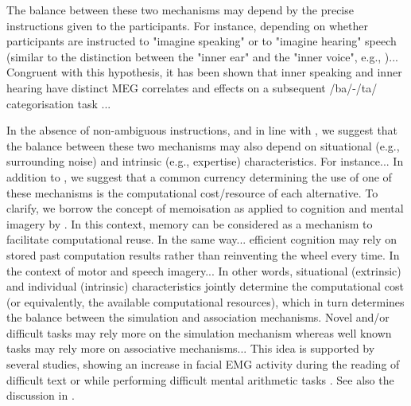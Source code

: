 \documentclass[utf8]{template/frontiersSCNS} %
\begin{document}
The balance between these two mechanisms may depend by the precise instructions given to the participants. For instance, depending on whether participants are instructed to "imagine speaking" or to "imagine hearing" speech (similar to the distinction between the "inner ear" and the "inner voice", e.g., \cite{smith_subvocalization_1992})... Congruent with this hypothesis, it has been shown that inner speaking and inner hearing have distinct MEG correlates and effects on a subsequent /ba/-/ta/ categorisation task \citep{ma_distinct_2019}...

In the absence of non-ambiguous instructions, and in line with \cite{tian_mental_2012}, we suggest that the balance between these two mechanisms may also depend on situational (e.g., surrounding noise) and intrinsic (e.g., expertise) characteristics. For instance... In addition to \cite{tian_mental_2012}, we suggest that a common currency determining the use of one of these mechanisms is the computational cost/resource of each alternative. To clarify, we borrow the concept of memoisation as applied to cognition and mental imagery by \cite{dasgupta_memory_2021}. In this context, memory can be considered as a mechanism to facilitate computational reuse. In the same way... efficient cognition may rely on stored past computation results rather than reinventing the wheel every time. In the context of motor and speech imagery... In other words, situational (extrinsic) and individual (intrinsic) characteristics jointly determine the computational cost (or equivalently, the available computational resources), which in turn determines the balance between the simulation and association mechanisms. Novel and/or difficult tasks may rely more on the simulation mechanism whereas well known tasks may rely more on associative mechanisms... This idea is supported by several studies, showing an increase in facial EMG activity during the reading of difficult text \cite{babar} or while performing difficult mental arithmetic tasks \cite{babar}. See also the discussion in \citep{nalborczyk_understanding_2019-1, nalborczyk_re-analysing_2020}.
\end{document}
